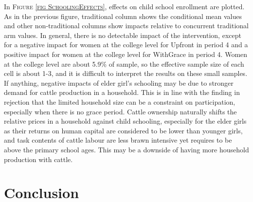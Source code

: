 	In \textsc{\footnotesize Figure \ref{fig SchoolingEffects}}, effects on child school enrollment are plotted. As in the previous figure, \textsf{traditional} column shows the conditional mean values and other non-\textsf{traditional} columns show impacts relative to concurrent \textsf{traditional} arm values. In general, there is no detectable impact of the intervention, except for a negative impact for women at the college level for \textsf{Upfront} in period 4 and a positive impact for women at the college level for \textsf{WithGrace} in period 4. Women at the college level are about 5.9\% of sample, so the effective sample size of each cell is about 1-3, and it is difficult to interpret the results on these small samples. If anything, negative impacts of elder girl's schooling may be due to stronger demand for cattle production in a household. This is in line with the finding in rejection that the limited household size can be a constraint on participation, especially when there is no grace period. Cattle ownership naturally shifts the relative prices in a household against child schooling, especially for the elder girls as their returns on human capital are considered to be lower than younger girls, and task contents of cattle labour are less brawn intensive yet requires to be above the primary school ages. This may be a downside of having more household production with cattle.



\section{Conclusion}
\label{SecConclusion}

